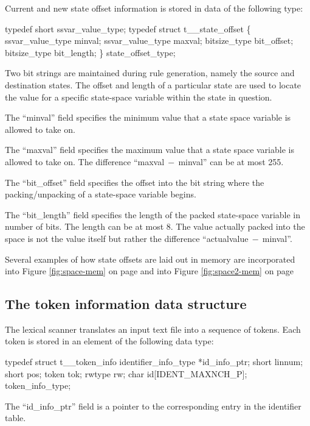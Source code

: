 Current and new state offset information is stored in data
of the following type:
\begin{codeexample}
typedef short ssvar_value_type;
typedef struct t__state_offset
   \{
      ssvar_value_type minval;
      ssvar_value_type maxval;
      bitsize_type bit_offset;
      bitsize_type bit_length;
   \} state_offset_type;
\end{codeexample}


Two bit strings
are maintained during rule generation, namely the source and destination
states.   The offset and length of a particular state are used to locate
the value for a specific state-space variable within the state in question.

The ``minval'' field specifies the minimum value that a state
space variable is allowed to take on.

The ``maxval'' field specifies the maximum value that a state
space variable is allowed to take on.  The difference ``maxval$~-~$minval''
can be at most 255.

The ``bit\_offset'' field specifies the offset into the bit string where
the packing/unpacking of a state-space variable begins.

The ``bit\_length'' field specifies the length of the packed state-space
variable in number of bits.   The length can be at most 8.   The value
actually packed into the space is not the value itself but rather the
difference ``actualvalue$~-~$minval''.

Several examples of how state offsets are laid out in memory are
incorporated into Figure \ref{fig:space-mem} on page \pageref{fig:space-mem}
and into Figure \ref{fig:space2-mem} on page \pageref{fig:space2-mem}

\subsection{The token information data structure}
\label{sec:tokinf}

The lexical scanner translates an input text file into a sequence of tokens.
Each token is stored in an element of the following data type:
\begin{codeexample}
typedef struct t__token_info
   {
      identifier_info_type *id_info_ptr;
      short linnum;
      short pos;
      token tok;
      rwtype rw;
      char id[IDENT_MAXNCH_P];
   } token_info_type;
\end{codeexample}


The ``id\_info\_ptr'' field is a pointer to the corresponding entry in the
identifier table.

